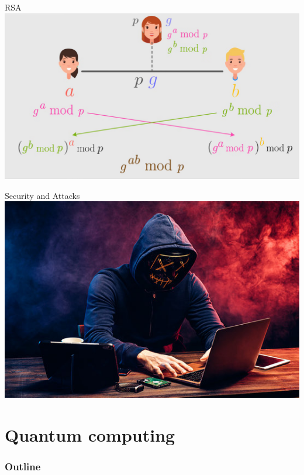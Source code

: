 \documentclass{beamer}
\begin{document}
\begin{frame}{RSA}
    \centering
    \includegraphics[width=\textwidth, height=0.9\textheight, keepaspectratio]{rsa 9.png}
\end{frame}

\begin{frame}{Security and Attacks}
    \centering
    \includegraphics[width=\textwidth, height=0.9\textheight, keepaspectratio]{hacker.jpg}
\end{frame}


\section{Quantum computing}
\begin{frame}
  \frametitle{Outline}
  \tableofcontents[currentsection]
\end{frame}
\end{document}
